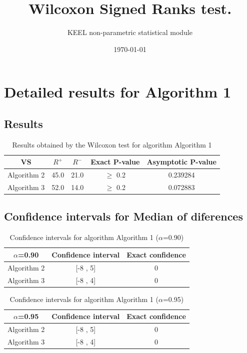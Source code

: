 \documentclass[a4paper,10pt]{article}
\title{Wilcoxon Signed Ranks test.}
\date{\today}
\author{KEEL non-parametric statistical module}
\begin{document}
\pagestyle{empty}
\maketitle
\thispagestyle{empty}



\section{Detailed results for Algorithm 1}


\subsection{Results}

\begin{table}[!htp]
\centering\small
\begin{tabular}{
|c|c|c|c|c|}
\hline
 VS & $R^{+}$ & $R^{-}$ & Exact P-value & Asymptotic P-value \\ \hline 
Algorithm 2 & 45.0 & 21.0 & $\geq$ 0.2 & 0.239284\\ \hline 
Algorithm 3 & 52.0 & 14.0 & $\geq$ 0.2 & 0.072883\\ \hline 

\end{tabular}
\caption{Results obtained by the Wilcoxon test for algorithm Algorithm 1}
\end{table}

\subsection{Confidence intervals for Median of diferences}

\begin{table}[!htp]
\centering\small
\begin{tabular}{
|c|c|c|}
\hline
 $\alpha$=0.90 & Confidence interval & Exact confidence \\ \hline 
Algorithm 2 & [-8 , 5] & 0\\ \hline 
Algorithm 3 & [-8 , 4] & 0\\ \hline 

\end{tabular}
\caption{Confidence intervals for algorithm Algorithm 1 ($\alpha$=0.90)}
\end{table}
\begin{table}[!htp]
\centering\small
\begin{tabular}{
|c|c|c|}
\hline
 $\alpha$=0.95 & Confidence interval & Exact confidence \\ \hline 
Algorithm 2 & [-8 , 5] & 0\\ \hline 
Algorithm 3 & [-8 , 4] & 0\\ \hline 

\end{tabular}
\caption{Confidence intervals for algorithm Algorithm 1 ($\alpha$=0.95)}
\end{table}
\end{document}
